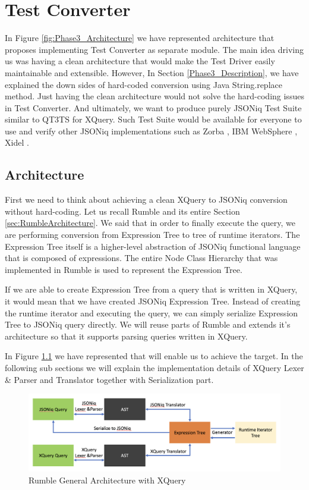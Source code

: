 
\chapter{Test Converter}
In Figure \ref{fig:Phase3_Architecture} we have represented architecture that proposes implementing Test Converter as separate module. The main idea driving us was having a clean architecture that would make the Test Driver easily maintainable and extensible. However, In Section \ref{Phase3_Description}, we have explained the down sides of hard-coded conversion using Java String.replace method. Just having the clean architecture would not solve the hard-coding issues in Test Converter. And ultimately, we want to produce purely JSONiq Test Suite similar to QT3TS for XQuery. Such Test Suite would be available for everyone to use and verify other JSONiq implementations such as Zorba \cite{Zorba}, IBM WebSphere \cite{WebSphere}, Xidel \cite{Xidel}.

\section{Architecture}
First we need to think about achieving a clean XQuery to JSONiq conversion without hard-coding. Let us recall Rumble and its entire Section \ref{sec:RumbleArchitecture}. We said that in order to finally execute the query, we are performing conversion from Expression Tree to tree of runtime iterators. The Expression Tree itself is a higher-level abstraction of JSONiq functional language that is composed of expressions. The entire Node Class Hierarchy that was implemented in Rumble is used to represent the Expression Tree.

If we are able to create Expression Tree from a query that is written in XQuery, it would mean that we have created JSONiq Expression Tree. Instead of creating the runtime iterator and executing the query, we can simply serialize Expression Tree to JSONiq query directly. We will reuse parts of Rumble and extends it's architecture so that it supports parsing queries written in XQuery. 

In Figure \ref{fig:Rumble_General_Architecture_With_XQuery} we have represented that will enable us to achieve the target. In the following sub sections we will explain the implementation details of XQuery Lexer \& Parser and Translator together with Serialization part. 

\begin{figure}[h!]
	\includegraphics[width=\linewidth]{double_parsing_architecture.png}
	\vspace*{-5mm}
	\caption{Rumble General Architecture with XQuery}
	\label{fig:Rumble_General_Architecture_With_XQuery}
\end{figure}

